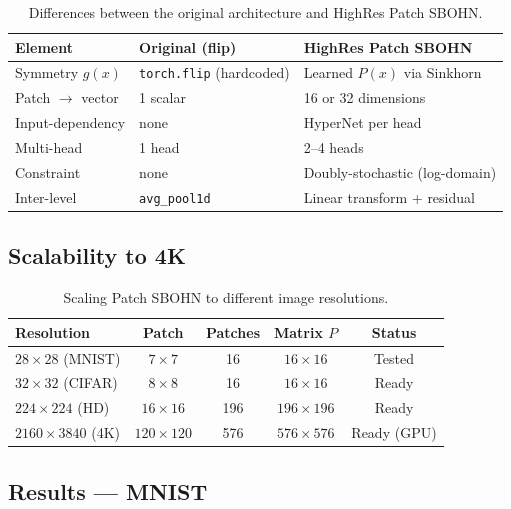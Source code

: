 \documentclass[11pt,a4paper]{report}
\begin{document}
\begin{table}[h]
\centering
\caption{Differences between the original architecture and HighRes Patch SBOHN.}
\begin{tabular}{lll}
\hline
\textbf{Element} & \textbf{Original (flip)} & \textbf{HighRes Patch SBOHN} \\
\hline
Symmetry $g(x)$    & \texttt{torch.flip} (hardcoded) & Learned $P(x)$ via Sinkhorn \\
Patch $\to$ vector  & 1 scalar                       & 16 or 32 dimensions \\
Input-dependency    & none                           & HyperNet per head \\
Multi-head          & 1 head                         & 2--4 heads \\
Constraint          & none                           & Doubly-stochastic (log-domain) \\
Inter-level         & \texttt{avg\_pool1d}           & Linear transform + residual \\
\hline
\end{tabular}
\end{table}

\subsection{Scalability to 4K}

\begin{table}[h]
\centering
\caption{Scaling Patch SBOHN to different image resolutions.}
\begin{tabular}{lcccc}
\hline
\textbf{Resolution} & \textbf{Patch} & \textbf{Patches} & \textbf{Matrix $P$} & \textbf{Status} \\
\hline
$28 \times 28$ (MNIST)   & $7 \times 7$   & 16  & $16 \times 16$   & Tested \\
$32 \times 32$ (CIFAR)   & $8 \times 8$   & 16  & $16 \times 16$   & Ready \\
$224 \times 224$ (HD)     & $16 \times 16$ & 196 & $196 \times 196$ & Ready \\
$2160 \times 3840$ (4K)   & $120 \times 120$ & 576 & $576 \times 576$ & Ready (GPU) \\
\hline
\end{tabular}
\end{table}

\subsection{Results --- MNIST}
\end{document}
